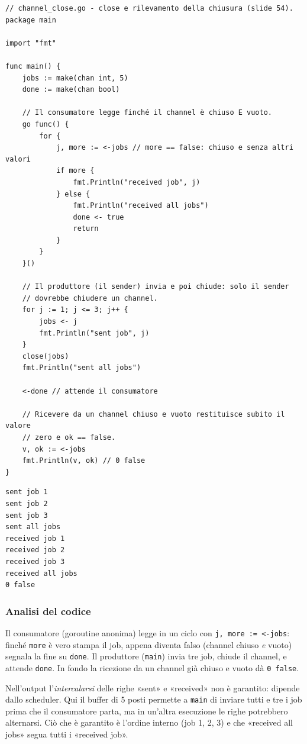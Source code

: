 \documentclass[11pt,a4paper]{report}
\newcommand{\cod}[1]{\texttt{#1}}
\begin{document}
\begin{lstlisting}[style=gocode,caption={\texttt{06\_concurrency/channel\_close.go}}]
// channel_close.go - close e rilevamento della chiusura (slide 54).
package main

import "fmt"

func main() {
	jobs := make(chan int, 5)
	done := make(chan bool)

	// Il consumatore legge finché il channel è chiuso E vuoto.
	go func() {
		for {
			j, more := <-jobs // more == false: chiuso e senza altri valori
			if more {
				fmt.Println("received job", j)
			} else {
				fmt.Println("received all jobs")
				done <- true
				return
			}
		}
	}()

	// Il produttore (il sender) invia e poi chiude: solo il sender
	// dovrebbe chiudere un channel.
	for j := 1; j <= 3; j++ {
		jobs <- j
		fmt.Println("sent job", j)
	}
	close(jobs)
	fmt.Println("sent all jobs")

	<-done // attende il consumatore

	// Ricevere da un channel chiuso e vuoto restituisce subito il valore
	// zero e ok == false.
	v, ok := <-jobs
	fmt.Println(v, ok) // 0 false
}
\end{lstlisting}
\begin{lstlisting}[style=output]
sent job 1
sent job 2
sent job 3
sent all jobs
received job 1
received job 2
received job 3
received all jobs
0 false
\end{lstlisting}

\subsubsection*{Analisi del codice}

Il consumatore (goroutine anonima) legge in un ciclo con
\cod{j, more := <-jobs}: finché \cod{more} è vero stampa il job, appena diventa
falso (channel chiuso \emph{e} vuoto) segnala la fine su \cod{done}. Il
produttore (\cod{main}) invia tre job, chiude il channel, e attende \cod{done}. In
fondo la ricezione da un channel già chiuso e vuoto dà \cod{0 false}.

\begin{nota}
Nell'output l'\emph{intercalarsi} delle righe «sent» e «received» non è
garantito: dipende dallo scheduler. Qui il buffer di 5 posti permette a \cod{main}
di inviare tutti e tre i job prima che il consumatore parta, ma in
un'altra esecuzione le righe potrebbero alternarsi. Ciò che è garantito è
l'ordine interno (job 1, 2, 3) e che «received all jobs» segua tutti i
«received job».
\end{nota}
\end{document}
